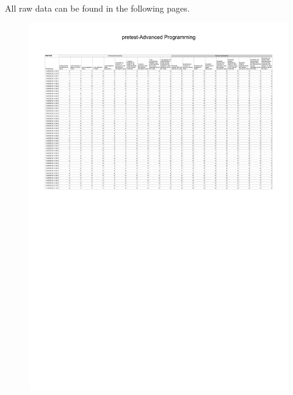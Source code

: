 All raw data can be found in the following pages.

\begin{figure}[H]
  \centering
    \includegraphics[angle=90]{sections/appendicies/data1.pdf}
    \caption*{}
\end{figure}

